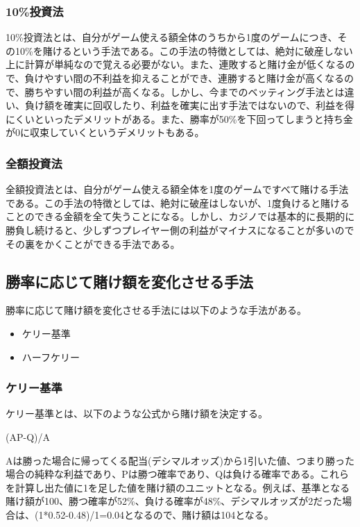 \subsubsection{10\%投資法}
10\%投資法とは、自分がゲーム使える額全体のうちから1度のゲームにつき、その10\%を賭けるという手法である。この手法の特徴としては、絶対に破産しない上に計算が単純なので覚える必要がない。また、連敗すると賭け金が低くなるので、負けやすい間の不利益を抑えることができ、連勝すると賭け金が高くなるので、勝ちやすい間の利益が高くなる。しかし、今までのベッティング手法とは違い、負け額を確実に回収したり、利益を確実に出す手法ではないので、利益を得にくいといったデメリットがある。また、勝率が50\%を下回ってしまうと持ち金が0に収束していくというデメリットもある。
\subsubsection{全額投資法}
全額投資法とは、自分がゲーム使える額全体を1度のゲームですべて賭ける手法である。この手法の特徴としては、絶対に破産はしないが、1度負けると賭けることのできる金額を全て失うことになる。しかし、カジノでは基本的に長期的に勝負し続けると、少しずつプレイヤー側の利益がマイナスになることが多いのでその裏をかくことができる手法である。

\subsection{勝率に応じて賭け額を変化させる手法}
勝率に応じて賭け額を変化させる手法には以下のような手法がある。
\begin{itemize}
\item ケリー基準
\item ハーフケリー
\end{itemize}
\subsubsection{ケリー基準}
ケリー基準とは、以下のような公式から賭け額を決定する。
\begin{center}
(AP-Q)/A
\end{center}
Aは勝った場合に帰ってくる配当(デシマルオッズ)から1引いた値、つまり勝った場合の純粋な利益であり、Pは勝つ確率であり、Qは負ける確率である。これらを計算し出た値に1を足した値を賭け額のユニットとなる。例えば、基準となる賭け額が100、勝つ確率が52\%、負ける確率が48\%、デシマルオッズが2だった場合は、(1*0.52-0.48)/1=0.04となるので、賭け額は104となる。
